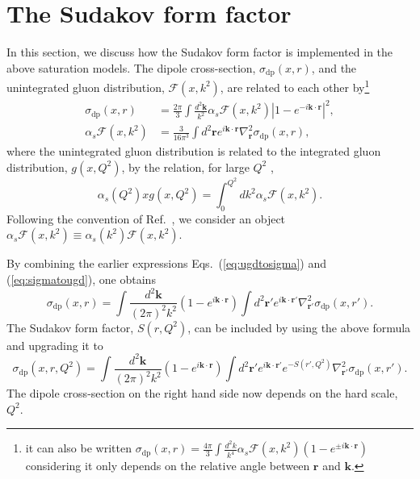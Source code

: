 \documentclass[11pt]{article}
\newcommand{\pairdot}[2]{ \mathbf{#1}\cdot\mathbf{#2}  }
\begin{document}
\section{The Sudakov form factor }
In this section, we discuss how the Sudakov form factor is implemented in the above saturation models. %
The dipole cross-section, $\sigma_{\mathrm{dp}}(x, r) $, and the unintegrated gluon distribution, $\mathcal{F}(x,k^2)$, are related to each other by\footnote{it can also be written $\sigma_{\mathrm{dp}}(x,r) = \frac{4 \pi}{3} \int\frac{d^2 k}{k^4} \alpha_s \mathcal{F}(x, k^2) \left(1-e^{\pm i \pairdot{k}{r}}\right) $ considering it only depends on the relative angle between $\mathbf{r}$ and $\mathbf{k}$.}
\cite{bgk2002}
\begin{align} 
\sigma_{\mathrm{dp}}(x,r) &= \frac{2 \pi}{3} \int\frac{d^2 \mathbf{k} }{k^2} \alpha_s \mathcal{F}(x, k^2) |1-e^{-i \pairdot{k}{r}}|^2,
\label{eq:ugdtosigma}\\
\alpha_s \mathcal{F}(x,k^2) &= \frac{3 }{16 \pi^3}\int d^2 \mathbf{r} e^{i \pairdot{k}{r}}  \nabla^2_{\mathbf{r}} \sigma_{\mathrm{dp}}(x,r),
\label{eq:sigmatougd}
\end{align}
where the unintegrated gluon distribution is related to the integrated gluon distribution, $g(x,Q^2)$, by the relation, for large $Q^2$ \cite{bgk2002},%
\begin{equation}
\alpha_s(Q^2) x g(x,Q^2)=\int^{Q^2}_{0} d k^2 \alpha_s \mathcal{F}(x,k^2).
\end{equation}
Following the convention of Ref.~\cite{bgk2002}, we consider an object $\alpha_s\mathcal{F}(x,k^2)\equiv\alpha_s(k^2)\mathcal{F}(x,k^2)$.

By combining the earlier expressions Eqs.~(\ref{eq:ugdtosigma}) and (\ref{eq:sigmatougd}), one obtains
\begin{equation}
\sigma_{\mathrm{dp}}(x,r) =\int \frac{d^2 \mathbf{k}}{(2\pi)^2k^2}\left( 1- e^{i \pairdot{k}{r}}\right) \int d^2 \mathbf{{r'} } e^{i\pairdot{k}{{r'} }}\nabla^2_{\mathbf{{r'} }}\sigma_{\mathrm{dp}}(x,{r'} ).
\label{eq:dptodp}
\end{equation}
The Sudakov form factor, $S(r,Q^2)$, can be included by using the above formula and upgrading it to
\cite{xiao2017}
\begin{equation}
\sigma_{\mathrm{dp}}(x,r,Q^2) =\int \frac{d^2 \mathbf{k}}{(2\pi)^2 k^2} \left( 1- e^{i \pairdot{k}{r}}\right) \int d^2 \mathbf{ {r'} } e^{i\pairdot{k}{{r'} }}e^{-S({r'} ,Q^2)} \nabla^2_{\mathbf{{r'} }}\sigma_{\mathrm{dp}}(x,{r'} ).
\end{equation}
The dipole cross-section on the right hand side now depends on the hard scale, $Q^2$.
\end{document}
